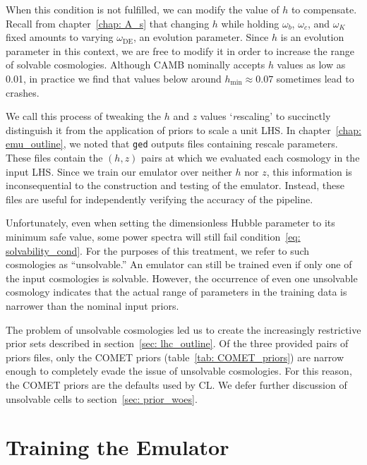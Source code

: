 When this condition is not fulfilled, we can modify the value of $h$ to
compensate. Recall from chapter~\ref{chap: A_s} that changing $h$ while
holding $\omega_b$, $\omega_c$, and $\omega_K$ fixed amounts to varying
$\omega_\text{DE}$, an evolution parameter. Since $h$ is an evolution
parameter in this context, we are free to modify it in order to increase the
range of solvable cosmologies. Although CAMB nominally accepts $h$ values as
low as 0.01, in practice we find that values below around
$h_\text{min} \approx 0.07$ sometimes lead to crashes.

We call this process of tweaking the $h$ and $z$ values
`\textit{re}scaling' to
succinctly distinguish it from the application of priors to scale a unit LHS.
In chapter~\ref{chap: emu_outline}, we noted that \texttt{ged} outputs
files containing rescale parameters. These files contain the $(h, z)$ pairs
at which we evaluated each cosmology in the input LHS. Since we train our
emulator over neither $h$ nor $z$, this information is inconsequential to the
construction and testing of the emulator. Instead, these files are useful for
independently verifying the accuracy of the pipeline.

Unfortunately, even when setting the dimensionless Hubble parameter to its
minimum safe value, some power spectra will still fail
condition~\ref{eq: solvability_cond}.
For the purposes of this treatment, we refer to such cosmologies as
``unsolvable.'' An emulator can still be trained even if only one of the input 
cosmologies is solvable. However, the occurrence of even one
unsolvable cosmology indicates that the actual range of parameters in the
training data is narrower than the nominal input priors. 

The problem of unsolvable cosmologies led us to create the
increasingly restrictive prior sets described in
section~\ref{sec: lhc_outline}.
Of the three provided pairs of priors files, only the COMET priors
(table~\ref{tab: COMET_priors}) are narrow enough to completely evade the 
issue of unsolvable cosmologies. For this reason, the COMET priors are the
defaults used by CL. We defer further discussion of unsolvable cells to
section~\ref{sec: prior_woes}.



\section{Training the Emulator}
\label{sec: train_emu}

